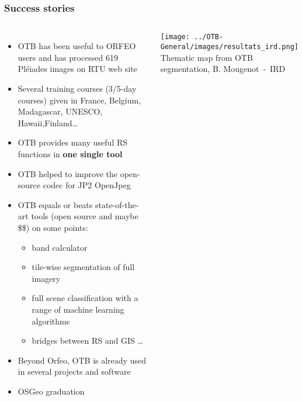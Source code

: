 \begin{frame}
  \frametitle{Success stories}
  \vspace{-0.5cm}
  \begin{columns}
    \begin{itemize}
    \item OTB has been useful to ORFEO users and has processed 619 Pléiades
      images on RTU web site
    \item Several training courses (3/5-day courses) given in France, Belgium,
      Madagascar, UNESCO, Hawaii,Finland\ldots
    \item OTB provides many useful RS functions in \textbf{one single tool}
    \item OTB helped to improve the open-source codec for JP2 OpenJpeg
    \item OTB equals or beats state-of-the-art tools (open source and maybe \$\$) on some points:
      \begin{itemize}
      \item band calculator
      \item tile-wise segmentation of full imagery
      \item full scene classification with a range of machine learning algorithms
      \item bridges between RS and GIS \ldots
      \end{itemize}
    \item Beyond Orfeo, OTB is already used in several projects and software
    \item OSGeo graduation
    \end{itemize}
    \texttt{[image: ../OTB-General/images/resultats\_ird.png]}\\
    \tiny{Thematic map from OTB segmentation, B. Mougenot~-~IRD}
  \end{columns}
\end{frame}

